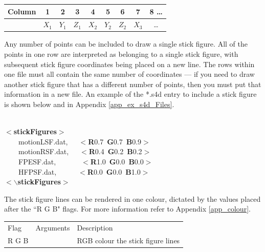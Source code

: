 \documentclass[singlecolumn,12pt]{article}
\newcommand{\hlstd}[1]{\textcolor[rgb]{0,0,0}{#1}}
\newcommand{\hlkey}[1]{\textcolor[rgb]{0,0,1}{\bf{#1}}}
\newcommand{\hlnum}[1]{\textcolor[rgb]{0.66,0,0.66}{#1}}
\begin{document}
\vspace{1cm}
\begin{center}
\begin{tabular}{c|c|c|c|c|c|c|c|c}
\hline Column & 1 & 2 & 3 & 4 & 5 & 6 & 7 & 8 \ldots \\
\hline & $X_1$ & $Y_1$ & $Z_1$ & $X_2$ & $Y_2$ & $Z_2$ & $X_3$ & \ldots\\
\end{tabular}
\end{center}
\vspace{1cm}

Any number of points can be included to draw a single stick figure.
All of the points in one row are interpreted as belonging to a
single stick figure, with subsequent stick figure coordinates being
placed on a new line. The rows within one file must all contain the
same number of coordinates --- if you need to draw another stick
figure that has a different number of points, then you must put that
information in a new file. An example of the *.s4d entry to include
a stick figure is shown below and in Appendix
\ref{app_ex_s4d_Files}.

\vspace{1cm}
\hlstd{\\
}\hlkey{$<$stickFigures$>$}\hlstd{\\
\hlstd{\ \ \ \ }motionL\textunderscore SF.dat,\hlstd{\ \ \ }}\hlkey{$<$R}\hlnum{0.7\ }\hlkey{G}\hlnum{0.7\ }\hlkey{B}\hlnum{0.9}\hlkey{$>$}\hlstd{\\
\hlstd{\ \ \ \ }motionR\textunderscore SF.dat,\hlstd{\ \ \ }}\hlkey{$<$R}\hlnum{0.4\ }\hlkey{G}\hlnum{0.2\ }\hlkey{B}\hlnum{0.2}\hlkey{$>$}\hlstd{\\
\hlstd{\ \ \ \ }FPE\textunderscore SF.dat,\hlstd{\ \ \ \ \ \ \ }}\hlkey{$<$R}\hlnum{1.0\ }\hlkey{G}\hlnum{0.0\ }\hlkey{B}\hlnum{0.0}\hlkey{$>$}\hlstd{\\
\hlstd{\ \ \ \ }HFP\textunderscore SF.dat,\hlstd{\ \ \ \ \ \ }}\hlkey{$<$R}\hlnum{0.0\ }\hlkey{G}\hlnum{0.0\ }\hlkey{B}\hlnum{1.0}\hlkey{$>$}\hlstd{\\
}\hlkey{$<$$\backslash$stickFigures$>$}\hlstd{}\mbox{} \vspace{1cm}

The stick figure lines can be rendered in one colour, dictated by
the values placed after the ``R G B" flags. For more information
refer to Appendix \ref{app_colour}.

\vspace{1cm}
\begin{tabular}{l l l}
\hline Flag & Arguments  & Description \\
R G B & & RGB colour the stick figure lines\\
\end{tabular}
\vspace{1cm}
\end{document}
